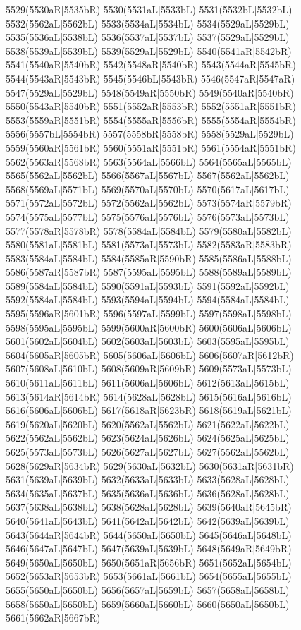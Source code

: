 5529(5530aR|5535bR) 5530(5531aL|5533bL) 5531(5532bL|5532bL) 5532(5562aL|5562bL) 5533(5534aL|5534bL) 5534(5529aL|5529bL) \\5535(5536aL|5538bL) 5536(5537aL|5537bL) 5537(5529aL|5529bL) 5538(5539aL|5539bL) 5539(5529aL|5529bL) 5540(5541aR|5542bR) 5541(5540aR|5540bR) 5542(5548aR|5540bR) 5543(5544aR|5545bR) \\5544(5543aR|5543bR) 5545(5546bL|5543bR) 5546(5547aR|5547aR) 5547(5529aL|5529bL) 5548(5549aR|5550bR) 5549(5540aR|5540bR) 5550(5543aR|5540bR) 5551(5552aR|5553bR) 5552(5551aR|5551bR) \\5553(5559aR|5551bR) 5554(5555aR|5556bR) 5555(5554aR|5554bR) 5556(5557bL|5554bR) 5557(5558bR|5558bR) 5558(5529aL|5529bL) 5559(5560aR|5561bR) 5560(5551aR|5551bR) 5561(5554aR|5551bR) \\5562(5563aR|5568bR) 5563(5564aL|5566bL) 5564(5565aL|5565bL) 5565(5562aL|5562bL) 5566(5567aL|5567bL) 5567(5562aL|5562bL) 5568(5569aL|5571bL) 5569(5570aL|5570bL) 5570(5617aL|5617bL) \\5571(5572aL|5572bL) 5572(5562aL|5562bL) 5573(5574aR|5579bR) 5574(5575aL|5577bL) 5575(5576aL|5576bL) 5576(5573aL|5573bL) 5577(5578aR|5578bR) 5578(5584aL|5584bL) 5579(5580aL|5582bL) \\5580(5581aL|5581bL) 5581(5573aL|5573bL) 5582(5583aR|5583bR) 5583(5584aL|5584bL) 5584(5585aR|5590bR) 5585(5586aL|5588bL) 5586(5587aR|5587bR) 5587(5595aL|5595bL) 5588(5589aL|5589bL) \\5589(5584aL|5584bL) 5590(5591aL|5593bL) 5591(5592aL|5592bL) 5592(5584aL|5584bL) 5593(5594aL|5594bL) 5594(5584aL|5584bL) 5595(5596aR|5601bR) 5596(5597aL|5599bL) 5597(5598aL|5598bL) \\5598(5595aL|5595bL) 5599(5600aR|5600bR) 5600(5606aL|5606bL) 5601(5602aL|5604bL) 5602(5603aL|5603bL) 5603(5595aL|5595bL) 5604(5605aR|5605bR) 5605(5606aL|5606bL) 5606(5607aR|5612bR) \\5607(5608aL|5610bL) 5608(5609aR|5609bR) 5609(5573aL|5573bL) 5610(5611aL|5611bL) 5611(5606aL|5606bL) 5612(5613aL|5615bL) 5613(5614aR|5614bR) 5614(5628aL|5628bL) 5615(5616aL|5616bL) \\5616(5606aL|5606bL) 5617(5618aR|5623bR) 5618(5619aL|5621bL) 5619(5620aL|5620bL) 5620(5562aL|5562bL) 5621(5622aL|5622bL) 5622(5562aL|5562bL) 5623(5624aL|5626bL) 5624(5625aL|5625bL) \\5625(5573aL|5573bL) 5626(5627aL|5627bL) 5627(5562aL|5562bL) 5628(5629aR|5634bR) 5629(5630aL|5632bL) 5630(5631aR|5631bR) 5631(5639aL|5639bL) 5632(5633aL|5633bL) 5633(5628aL|5628bL) \\5634(5635aL|5637bL) 5635(5636aL|5636bL) 5636(5628aL|5628bL) 5637(5638aL|5638bL) 5638(5628aL|5628bL) 5639(5640aR|5645bR) 5640(5641aL|5643bL) 5641(5642aL|5642bL) 5642(5639aL|5639bL) \\5643(5644aR|5644bR) 5644(5650aL|5650bL) 5645(5646aL|5648bL) 5646(5647aL|5647bL) 5647(5639aL|5639bL) 5648(5649aR|5649bR) 5649(5650aL|5650bL) 5650(5651aR|5656bR) 5651(5652aL|5654bL) \\5652(5653aR|5653bR) 5653(5661aL|5661bL) 5654(5655aL|5655bL) 5655(5650aL|5650bL) 5656(5657aL|5659bL) 5657(5658aL|5658bL) 5658(5650aL|5650bL) 5659(5660aL|5660bL) 5660(5650aL|5650bL) \\5661(5662aR|5667bR) 